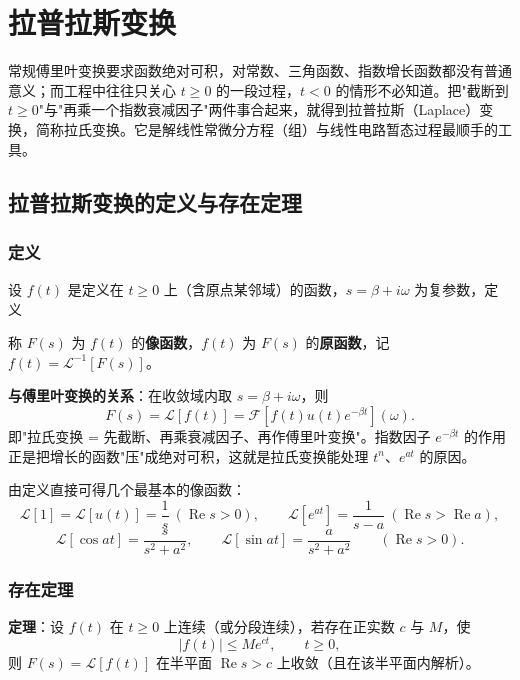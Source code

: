 \chapter{拉普拉斯变换}

常规傅里叶变换要求函数绝对可积，对常数、三角函数、指数增长函数都没有普通意义；而工程中往往只关心 \(t\ge0\) 的一段过程，\(t<0\) 的情形不必知道。把"截断到 \(t\ge0\)"与"再乘一个指数衰减因子"两件事合起来，就得到拉普拉斯（Laplace）变换，简称拉氏变换。它是解线性常微分方程（组）与线性电路暂态过程最顺手的工具。

\section{拉普拉斯变换的定义与存在定理}

\subsection{定义}

设 \(f(t)\) 是定义在 \(t\ge0\) 上（含原点某邻域）的函数，\(s=\beta+i\omega\) 为复参数，定义


称 \(F(s)\) 为 \(f(t)\) 的\textbf{像函数}，\(f(t)\) 为 \(F(s)\) 的\textbf{原函数}，记 \(f(t)=\mathscr{L}^{-1}[F(s)]\)。

\textbf{与傅里叶变换的关系}：在收敛域内取 \(s=\beta+i\omega\)，则
\[
F(s)=\mathscr{L}[f(t)]=\mathscr{F}\left[f(t)u(t)e^{-\beta t}\right](\omega).
\]
即"拉氏变换 = 先截断、再乘衰减因子、再作傅里叶变换"。指数因子 \(e^{-\beta t}\) 的作用正是把增长的函数"压"成绝对可积，这就是拉氏变换能处理 \(t^n\)、\(e^{at}\) 的原因。

由定义直接可得几个最基本的像函数：
\[
\mathscr{L}[1]=\mathscr{L}[u(t)]=\frac{1}{s}\ (\operatorname{Re}s>0),\qquad
\mathscr{L}\left[e^{at}\right]=\frac{1}{s-a}\ (\operatorname{Re}s>\operatorname{Re}a),
\]
\[
\mathscr{L}[\cos at]=\frac{s}{s^2+a^2},\qquad
\mathscr{L}[\sin at]=\frac{a}{s^2+a^2}\qquad(\operatorname{Re}s>0).
\]

\subsection{存在定理}

\textbf{定理}：设 \(f(t)\) 在 \(t\ge0\) 上连续（或分段连续），若存在正实数 \(c\) 与 \(M\)，使
\[
|f(t)|\le Me^{ct},\qquad t\ge0,
\]
则 \(F(s)=\mathscr{L}[f(t)]\) 在半平面 \(\operatorname{Re}s>c\) 上收敛（且在该半平面内解析）。

